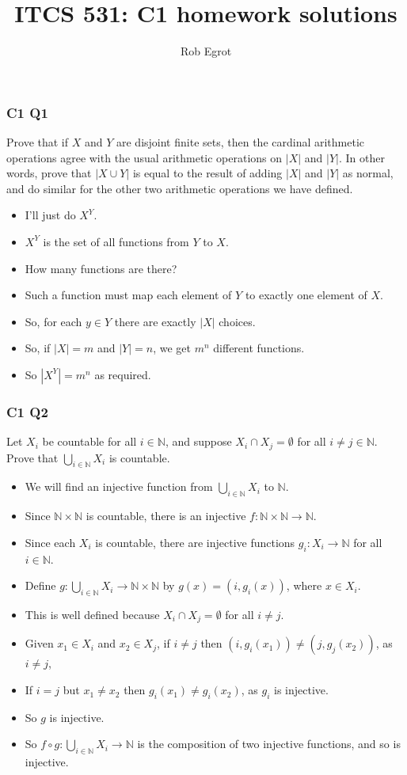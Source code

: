 \documentclass[handout]{beamer}
\title{ITCS 531: C1 homework solutions}
\date{}
\author{Rob Egrot}
\newcommand{\bN}{\mathbb{N}}
\begin{document}
\begin{frame}
\titlepage
\end{frame}

\begin{frame}
\frametitle{C1 Q1}
Prove that if $X$ and $Y$ are disjoint finite sets, then the cardinal arithmetic operations agree with the usual arithmetic operations on $|X|$ and $|Y|$. In other words, prove that $|X\cup Y|$ is equal to the result of adding $|X|$ and $|Y|$ as normal, and do similar for the other two arithmetic operations we have defined.
\vspace{0.5cm}
\begin{itemize}
\item I'll just do $X^Y$.
\item $X^Y$ is the set of all functions from $Y$ to $X$. 
\item How many functions are there? 
\item Such a function must map each element of $Y$ to exactly one element of $X$. 
\item So, for each $y\in Y$ there are exactly $|X|$ choices. 
\item So, if $|X| = m$ and $|Y|=n$, we get $m^n$ different functions. 
\item So $|X^Y|=m^n$ as required.
\end{itemize}
\end{frame}

\begin{frame}
\frametitle{C1 Q2}
Let $X_i$ be countable for all $i\in \bN$, and suppose $X_i\cap X_j=\emptyset$ for all $i\neq j\in \bN$. Prove that $\bigcup_{i\in\bN} X_i$ is countable.
\begin{itemize}
\item We will find an injective function from $\bigcup_{i\in\bN} X_i$ to $\bN$. 
\item Since $\bN\times\bN$ is countable, there is an injective $f:\bN\times\bN\to \bN$. 
\item Since each $X_i$ is countable, there are injective functions $g_i:X_i\to \bN$ for all $i\in\bN$. 
\item Define $g:\bigcup_{i\in\bN} X_i\to \bN\times\bN$ by $g(x) = (i,g_i(x))$, where $x\in X_i$. 
\item This is well defined because $X_i\cap X_j = \emptyset$ for all $i\neq j$. 
\item Given $x_1\in X_i$ and $x_2\in X_j$, if $i\neq j$ then $(i,g_i(x_1))\neq (j,g_j(x_2))$, as $i\neq j$, 
\item If $i=j$ but $x_1\neq x_2$ then $g_i(x_1)\neq g_i(x_2)$, as $g_i$ is injective. 
\item So $g$ is injective.
\item So $f\circ g:\bigcup_{i\in\bN} X_i\to \bN$ is the composition of two injective functions, and so is injective. 
\end{itemize}
\end{frame}
\end{document}
